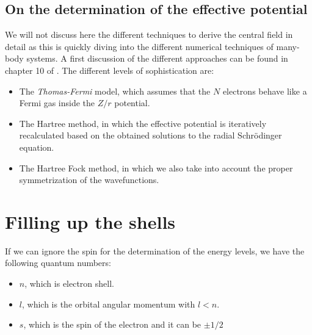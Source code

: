 \documentclass[10pt]{article}
\let\cite\citep
\providecommand\citep{\cite}
\begin{document}
\subsection{On the determination of the effective potential}
We will not discuss here the different techniques to derive the central field in detail as this is quickly diving into the different numerical techniques of many-body systems. A first discussion of the different approaches can be found in chapter 10 of \cite{Hertel_2015}. The different levels of sophistication are:
\begin{itemize}
\item The \textit{Thomas-Fermi} model, which assumes that the $N$ electrons behave like a  Fermi gas inside the $Z/r$ potential.
\item The Hartree method, in which the effective potential is iteratively recalculated based on the obtained solutions to the radial Schrödinger equation.
\item The Hartree Fock method, in which we also take into account the proper symmetrization of the wavefunctions.
\end{itemize}



\section{Filling up the shells}

If we can ignore the spin for the determination of the energy levels, we have the following quantum numbers:

\begin{itemize}
\item $n$, which is electron shell.
\item $l$, which is the orbital angular momentum with $l<n$.
\item $s$, which is the spin of the electron and it can be $\pm 1/2$
\end{itemize}
\end{document}
